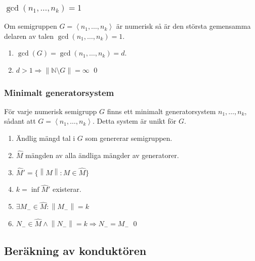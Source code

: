 \documentclass{beamer}
\begin{document}
\begin{frame}
	\frametitle{$\gcd(n_1, \ldots, n_k) = 1$}
\begin{Theorem}
	Om semigruppen $G = \left<n_1, \ldots, n_k\right>$ är numerisk så är den största gemensamma delaren av talen $\gcd(n_1, \ldots, n_k) = 1$.
\end{Theorem}

\begin{enumerate}
	\item<3-> $\gcd(G)=\gcd(n_1,\ldots,n_k)=d$.
	\item<4-> $d>1 \Longrightarrow \left\|\mathbb{N} \setminus G \right\| = \infty$
	\qed
\end{enumerate}
\end{frame}

\begin{frame}
	\frametitle{Minimalt generatorsystem}
\begin{Theorem}
	För varje numerisk semigrupp $G$ finns ett minimalt generatorsystem $n_1, \ldots, n_k$, sådant att $G = \left<n_1, \ldots, n_k\right>$. Detta system är unikt för $G$.
\end{Theorem}

\begin{enumerate}
	\item<3-> Ändlig mängd tal i $G$ som genererar semigruppen.
	\item<4-> $\widehat{M}$ mängden av alla ändliga mängder av generatorer.
	\item<5-> $\widehat{M}' = \{ \left\|M\right\| : M \in \widehat{M}\}$
	\item<6-> $k = \inf \widehat{M}'$ existerar.
	\item<7-> $\exists M_- \in \widehat{M} : \left\|M_-\right\|=k$
	\item<8-> $N_- \in \widehat{M} \wedge \left\|N_-\right\|=k \Longrightarrow N_- = M_-$
	\qed
\end{enumerate}\end{frame}

\subsection{Beräkning av konduktören}
\end{document}
